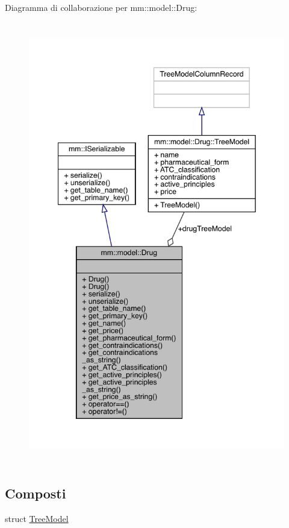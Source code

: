 Diagramma di collaborazione per mm\+:\+:model\+:\+:Drug\+:\nopagebreak
\begin{figure}[H]
\begin{center}
\leavevmode
\includegraphics[height=550pt]{d7/d98/classmm_1_1model_1_1_drug__coll__graph}
\end{center}
\end{figure}
\subsection*{Composti}
\begin{DoxyCompactItemize}
\item 
struct \hyperlink{structmm_1_1model_1_1_drug_1_1_tree_model}{Tree\+Model}
\end{DoxyCompactItemize}
